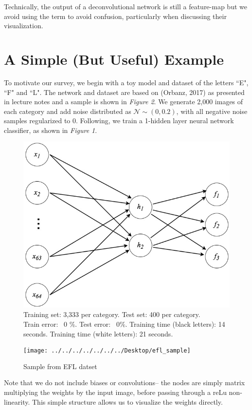 \documentclass[12pt]{article}
\begin{document}
Technically, the output of a deconvolutional network is still a feature-map but we avoid using the term to avoid confusion, particularly when discussing their visualization.

\section{A Simple (But Useful) Example}
To motivate our survey, we begin with a toy model and dataset of the letters ``E", ``F" and ``L". The network and dataset are based on (Orbanz, 2017) as presented in lecture notes and a sample is shown in \textit{Figure 2}. We generate 2,000 images of each category and add noise distributed as $\mathcal{N} \sim (0, 0.2)$, with all negative noise samples regularized to 0. Following, we train a 1-hidden layer neural network classifier, as shown in \textit{Figure 1}. \\

\begin{figure}[h]
\centering
\includegraphics[width=0.7\linewidth]{../diagrams/EFL_network}
\caption{Training set: 3,333 per category. Test set: 400 per category.\\ Train error: ~0 \%. Test error: ~0\%. Training time (black letters): 14 seconds. Training time (white letters): 21 seconds.}
\label{fig:eflnetwork}
\end{figure}

\begin{figure}[h]
	\centering
	\texttt{[image: ../../../../../../../Desktop/efl\_sample]}
	\caption{Sample from EFL datset}
	\label{fig:eflsample}
\end{figure}

\pagebreak

Note that we do not include biases or convolutions-- the nodes are simply matrix multiplying the weights by the input image, before passing through a reLu non-linearity. This simple structure allows us to visualize the weights directly. \\
\end{document}
